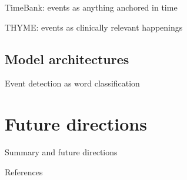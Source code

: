 \documentclass[12pt,compress]{beamer}
\begin{document}
\begin{frame}{TimeBank: events as anything anchored in time}
\end{frame}


\begin{frame}{THYME: events as clinically relevant happenings}
\end{frame}




\subsection{Model architectures}

\begin{frame}{Event detection as word classification}
\end{frame}


\section{Future directions}


\begin{frame}{Summary and future directions}
\end{frame}


\begin{frame}[allowframebreaks]{References}
\printbibliography
\end{frame}
\end{document}

